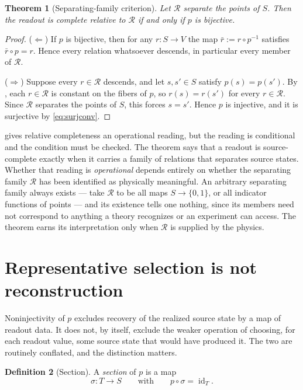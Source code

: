 \documentclass[11pt,reqno]{amsart}
\theoremstyle{plain}
\newtheorem{theorem}{Theorem}[section]
\theoremstyle{definition}
\newtheorem{definition}[theorem]{Definition}
\theoremstyle{remark}
\DeclareMathOperator{\id}{id}
\begin{document}
\begin{theorem}[Separating-family criterion]
\label{thm:separating}
Let $\mathcal{R}$ separate the points of $S$. Then the readout is complete relative to $\mathcal{R}$ if and only if $p$ is bijective.
\end{theorem}

\begin{proof}
($\Leftarrow$) If $p$ is bijective, then for any $r\colon S\to V$ the map $\bar r:=r\circ p^{-1}$ satisfies $\bar r\circ p=r$. Hence every relation whatsoever descends, in particular every member of $\mathcal{R}$.

($\Rightarrow$) Suppose every $r\in\mathcal{R}$ descends, and let $s,s'\in S$ satisfy $p(s)=p(s')$. By , each $r\in\mathcal{R}$ is constant on the fibers of $p$, so $r(s)=r(s')$ for every $r\in\mathcal{R}$. Since $\mathcal{R}$ separates the points of $S$, this forces $s=s'$. Hence $p$ is injective, and it is surjective by \eqref{eq:surjconv}.
\end{proof}

 gives relative completeness an operational reading, but the reading is conditional and the condition must be checked. The theorem says that a readout is source-complete exactly when it carries a family of relations that separates source states. Whether that reading is \emph{operational} depends entirely on whether the separating family $\mathcal{R}$ has been identified as physically meaningful. An arbitrary separating family always exists --- take $\mathcal{R}$ to be all maps $S\to\{0,1\}$, or all indicator functions of points --- and its existence tells one nothing, since its members need not correspond to anything a theory recognizes or an experiment can access. The theorem earns its interpretation only when $\mathcal{R}$ is supplied by the physics.

\section{Representative selection is not reconstruction}
\label{sec:selection}

Noninjectivity of $p$ excludes recovery of the realized source state by a map of readout data. It does not, by itself, exclude the weaker operation of choosing, for each readout value, some source state that would have produced it. The two are routinely conflated, and the distinction matters.

\begin{definition}[Section]
\label{def:section}
A \emph{section} of $p$ is a map
\begin{equation}
\label{eq:section}
\sigma\colon T\longrightarrow S
\qquad\text{with}\qquad
p\circ\sigma=\id_{T}.
\end{equation}
\end{definition}
\end{document}
